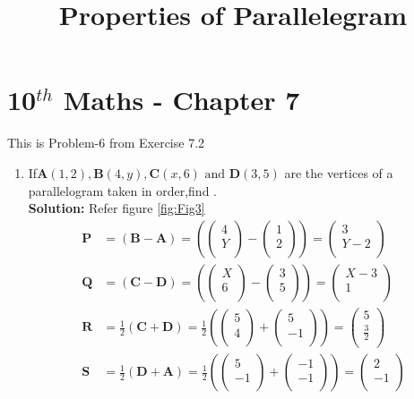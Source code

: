 \documentclass[12pt]{article}
\providecommand{\brak}[1]{\ensuremath{\left(#1\right)}}
\newcommand{\solution}{\noindent \textbf{Solution: }}
\newcommand{\myvec}[1]{\ensuremath{\begin{pmatrix}#1\end{pmatrix}}}
\let\vec\mathbf
\begin{document}
\begin{center}
\title{\textbf{Properties of Parallelegram}}
\date{\vspace{-5ex}} %
\maketitle
\end{center}

\setcounter{page}{1}

\section{10$^{th}$ Maths - Chapter 7}

This is Problem-6 from Exercise 7.2

\begin{enumerate}

\item If$\vec{A}(1, 2),\vec{B}(4, y),\vec{C}(x, 6) \text{ and } \vec{D}(3, 5)$ are the vertices of a parallelogram taken in order,find \vec{x} \vec{y}.\\
\solution 
Refer figure \ref{fig:Fig3}
\begin{align}
  \label{eq:det2f}
  \vec{P} &=\brak{\vec{B}-\vec{A}} = \brak{\myvec{
  4 \\
  Y \\
 } - \myvec{
  1 \\
  2 \\
 } 
 } = \myvec{
 3 \\
 Y-2 \\
 }   \\
 \vec{Q} &= \brak{\vec{C}-\vec{D}} = \brak{\myvec{
  X \\
  6 \\
 } - \myvec{
  3 \\
  5 \\
 } 
 } = \myvec{
 X-3 \\
 1 \\
 }   \\
 \vec{R} &= \frac{1}{2}\brak{\vec{C}+\vec{D}} =   \frac{1}{2}\brak{\myvec{
  5 \\
  4 \\
 } + \myvec{
  5 \\
  -1\\
 } 
 } = \myvec{
 5 \\
 \frac{3}{2} \\
 }   \\
 \vec{S} &= \frac{1}{2}\brak{\vec{D}+\vec{A}} =   \frac{1}{2}\brak{\myvec{
  5 \\
  -1 \\
 } + \myvec{
  -1 \\
  -1\\
 } 
 } = \myvec{
 2\\
 -1 \\
 }   \\
\end{align}


\end{enumerate}
\end{document}
